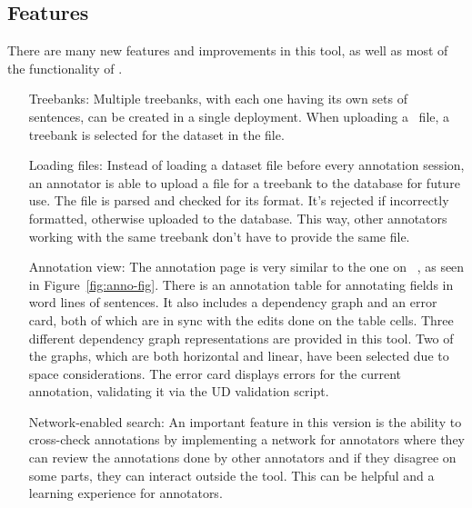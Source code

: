 \subsection{Features}
\label{sec:features}

There are many new features and improvements in this tool, as well as most of the functionality of \boatvone.

\begin{itemize}[before=\normalfont, font=\itshape, align=left]
    \item[Treebanks:]
        Multiple treebanks, with each one having its own sets of sentences, can be created in a single deployment.
        When uploading a \conllu\ file, a treebank is selected for the dataset in the file.

    \item[Loading files:]
        Instead of loading a dataset file before every annotation session, an annotator is able to upload a \conllu file for a treebank to the database for future use.
        The file is parsed and checked for its format. It's rejected if incorrectly formatted, otherwise uploaded to the database.
        This way, other annotators working with the same treebank don't have to provide the same file.

    \item[Annotation view:]
        The annotation page is very similar to the one on \boatvone~\cite{trk2020resources}, as seen in Figure~\ref{fig:anno-fig}.
        There is an annotation table for annotating fields in word lines of sentences.
        It also includes a dependency graph and an error card, both of which are in sync with the edits done on the table cells.
        Three different dependency graph representations are provided in this tool.
        Two of the graphs, which are both horizontal and linear, have been selected due to space considerations.
        The error card displays errors for the current annotation, validating it via the UD validation script.

    \item[Network-enabled search:]
        An important feature in this version is the ability to cross-check annotations by implementing a network for annotators where they can review the annotations done by other annotators and if they disagree on some parts, they can interact outside the tool. %
        This can be helpful and a learning experience for annotators.


\end{itemize}
